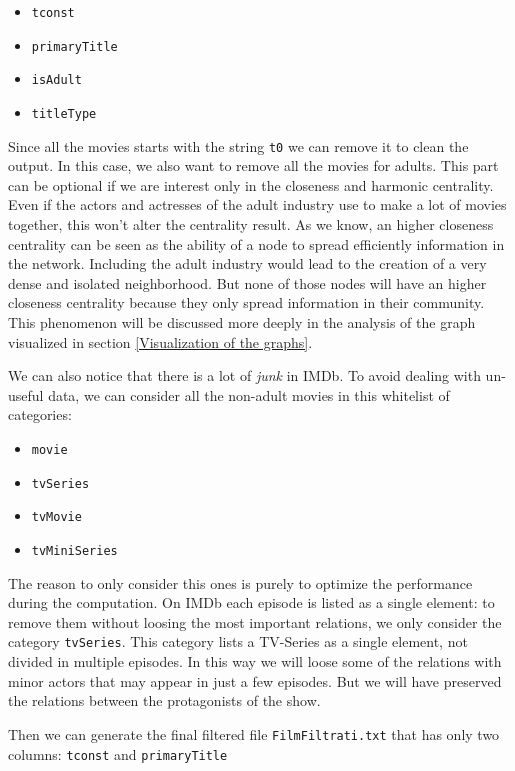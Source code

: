 \begin{itemize}
    \item \texttt{tconst}
    \item \texttt{primaryTitle}
    \item \texttt{isAdult}
    \item \texttt{titleType}
\end{itemize}
Since all the movies starts with the string \texttt{t0} we can remove it to clean the output. In this case, we also want to remove all the movies for adults. This part can be optional if we are interest only in the closeness and harmonic centrality. Even if the actors and actresses of the adult industry use to make a lot of movies together, this won't alter the centrality result. As we know, an higher closeness centrality can be seen as the ability of a node to spread efficiently information in the network. Including the adult industry would lead to the creation of a very dense and isolated neighborhood. But none of those nodes will have an higher closeness centrality because they only spread information in their community. This phenomenon will be discussed more deeply in the analysis of the graph visualized in section \ref{Visualization of the graphs}. \s

\noindent We can also notice that there is a lot of \emph{junk} in IMDb. To avoid dealing with un-useful data, we can consider all the non-adult movies in this whitelist of categories:

\begin{itemize}
    \item \texttt{movie}
    \item \texttt{tvSeries}
    \item \texttt{tvMovie}
    \item \texttt{tvMiniSeries}
\end{itemize}
The reason to only consider this ones is purely to optimize the performance during the computation. On IMDb each episode is listed as a single element: to remove them without loosing the most important relations, we only consider the category \texttt{tvSeries}. This category lists a TV-Series as a single element, not divided in multiple episodes. In this way we will loose some of the relations with minor actors that may appear in just a few episodes. But we will have preserved the relations between the protagonists of the show. \s

\noindent Then we can generate the final filtered file \texttt{FilmFiltrati.txt} that has only two columns: \texttt{tconst} and \texttt{primaryTitle}

